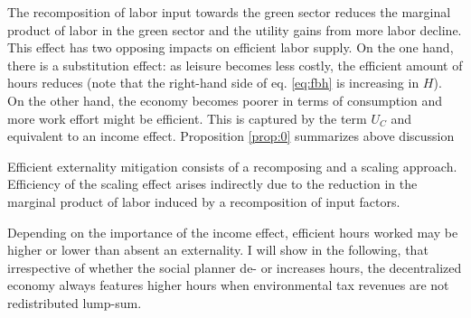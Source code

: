 The recomposition of labor input towards the  green sector reduces the marginal product of labor in the green sector and the utility gains from more labor decline.  This effect has two opposing impacts on efficient labor supply. On the one hand, there is a substitution effect: as leisure becomes less costly, the efficient amount of hours reduces (note that the right-hand side of eq. \eqref{eq:fbh} is increasing in $H$). On the other hand, the economy becomes poorer in terms of consumption and more work effort might be efficient. This is captured by the term $U_C$ and equivalent to an income effect. 
Proposition \ref{prop:0} summarizes above discussion
\begin{prop}\label{prop:0}
	Efficient externality mitigation consists of a recomposing and a scaling approach. Efficiency of the scaling effect arises indirectly due to the reduction in the marginal product of labor induced by a recomposition of input factors.
\end{prop}


Depending on the importance of the income effect, efficient hours worked may be higher or lower than  absent an externality. %
I will show in the following, that irrespective of whether the social planner de- or increases hours, the decentralized economy always features higher hours when environmental tax revenues are not redistributed lump-sum. 

\begin{comment}
\hrule
One can show that the total effect of a drop in the fossil labor share on hours worked is positive, i.e. $\frac{dh_{FB}}{ds}>0$, if $\theta<\frac{\varepsilon}{\varepsilon-s}$. If the income effect dominates, the social planner increases hours worked as the economy becomes less productive. 
Under the value for $\theta$ suggested by \cite{Boppart2019LaborPerspectiveb}, the efficient scale effect is to increase hours worked. When, however, the substitution effect outweighs or dominates the income effect - as commonly assumed in the public finance literature \citep{Heathcote2017OptimalFramework, LansBovenberg1994EnvironmentalTaxation, LansBovenberg1996OptimalAnalyses} \tr{CHECK this}!.
Nevertheless, the level of hours worked exceeds the efficient level irrespective of $\theta$ when no lump-sum transfers are available. 
When the efficient level of hours increases, though, the fossil labor share reduces even more to outweigh the increase in the externality.

content...
\end{comment}
